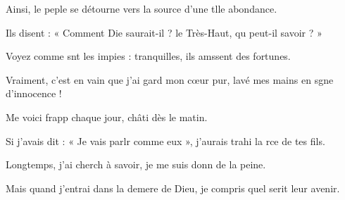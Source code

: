 \item Ainsi, le peple se détourne\psstar{} vers la source d’une tlle abondance.
\item Ils disent : « Comment Die saurait-il ?\psstar{} le Très-Haut, qu peut-il savoir ? »
\item Voyez comme snt les impies :\psstar{} tranquilles, ils amssent des fortunes.
\item Vraiment, c’est en vain que j’ai gard mon cœur pur,\psstar{} lavé mes mains en sgne d’innocence !
\item Me voici frapp chaque jour,\psstar{} châti dès le matin.
\item Si j’avais dit : « Je vais parlr comme eux »,\psstar{} j’aurais trahi la rce de tes fils.
\item Longtemps, j’ai cherch à savoir,\psstar{} je me suis donn de la peine.
\item Mais quand j’entrai dans la demere de Dieu,\psstar{} je compris quel serit leur avenir.